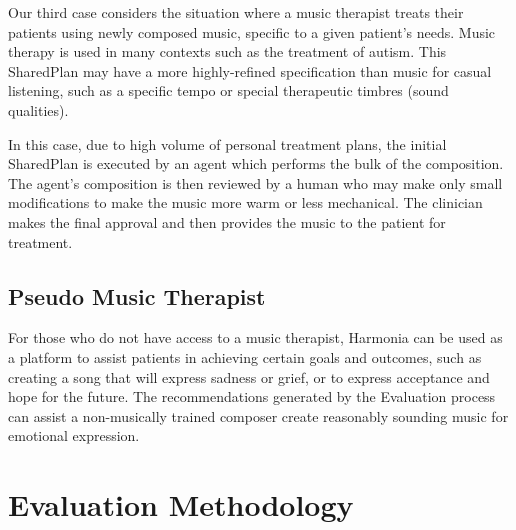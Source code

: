 \documentclass[final,authoryear,5p,times,twocolumn]{elsarticle}
\begin{document}
Our third case considers the situation where a music therapist treats their patients using newly composed music, specific to a given patient's needs. Music therapy is used in many contexts such as the treatment of autism. This SharedPlan may have a more highly-refined specification than music for casual listening, such as a specific tempo or special therapeutic timbres (sound qualities). 

In this case, due to high volume of personal treatment plans, the initial SharedPlan is executed by an agent which performs the bulk of the composition. The agent's composition is then reviewed by a human who may make only small modifications to make the music more warm or less mechanical. The clinician makes the final approval and then provides the music to the patient for treatment.

\subsection{Pseudo Music Therapist}

For those who do not have access to a music therapist, Harmonia can be used as a platform to assist patients in achieving certain goals and outcomes, such as creating a song that will express sadness or grief, or to express acceptance and hope for the future. The recommendations generated by the Evaluation process can assist a non-musically trained composer create reasonably sounding music for emotional expression.


\section{Evaluation Methodology}




\end{document}
